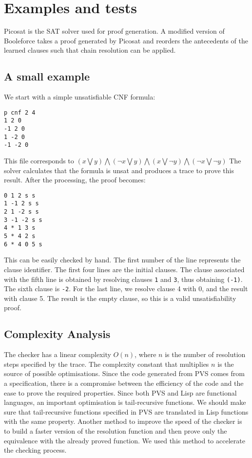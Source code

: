 \documentclass[a4paper,12pt]{article}
\begin{document}
\section{Examples and tests}
Picosat is the SAT solver used for proof generation. A modified version of Booleforce takes a proof generated by Picosat and
reorders the antecedents of the learned clauses such that chain resolution can be applied. 
\subsection{A small example}
We start with a simple unsatisfiable CNF formula:
\begin{verbatim}
p cnf 2 4
1 2 0
-1 2 0
1 -2 0
-1 -2 0
\end{verbatim}
This file corresponds to $(x \bigvee y) \bigwedge (\neg x \bigvee y) \bigwedge (x \bigvee \neg y) \bigwedge (\neg x \bigvee \neg y)$
The solver calculates that the formula is unsat and produces a trace to prove this result. After the processing, the proof 
becomes:
\begin{verbatim}
0 1 2 s s
1 -1 2 s s
2 1 -2 s s
3 -1 -2 s s
4 * 1 3 s
5 * 4 2 s
6 * 4 0 5 s
\end{verbatim}
This can be easily checked by hand. The first number of the line represents the clause identifier. The first four lines are 
the initial clauses. The clause associated with the fifth line is obtained by resolving clauses \verb|1| and \verb|3|, thus obtaining \verb|(-1)|.
The sixth clause is \verb |-2|. For the last line, we resolve clause 4 with 0, and the result with clause 5. The result is the empty
clause, so this is a valid unsatisfiability proof.

\subsection{Complexity Analysis}
The checker has a linear complexity $O(n)$, where $n$ is the number of resolution steps specified by the trace. The complexity constant
that multiplies $n$ is the source of possible optimisations. Since the code generated from PVS comes from a specification, there is
a compromise between the efficiency of the code and the ease to prove the required properties. Since both PVS and Lisp 
are functional languages, an important optimisation is tail-recursive functions. We should make sure that tail-recursive functions
specified in PVS are translated in Lisp functions with the same property. Another method to improve the speed of the checker is to 
build a faster version of the resolution function and then prove only the equivalence with the already proved function. We used this 
method to accelerate the checking process.
\end{document}
